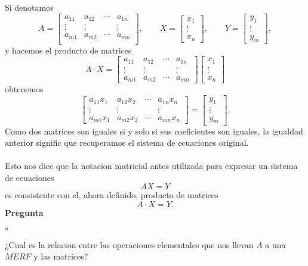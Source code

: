 \documentclass{article}
\theoremstyle{definition}
\theoremstyle{definition}
\theoremstyle{remark}
\begin{document}
Si denotamos \[
  A=\begin{bmatrix} a_{11} & a_{12} & \cdots & a_{1n} \\ 
    \vdots & \vdots && \vdots \\
    a_{m1} & a_{m2} & \cdots & a_{mn} \\
    \end{bmatrix}, 
    \quad \quad 
    X=\begin{bmatrix} x_1 \\ \vdots \\ x_n \end{bmatrix}, \quad \quad Y=\begin{bmatrix} y_1 \\ \vdots \\ y_m \end{bmatrix}
,\]
y hacemos el producto de matrices \[
  A \cdot X = \begin{bmatrix} a_{11} & a_{12} & \cdots & a_{1n} \\ 
    \vdots & \vdots & & \vdots \\
    a_{m1} & a_{m2} & \cdots & a_{mn} \end{bmatrix} \begin{bmatrix} x_1 \\ \vdots \\ x_n \end{bmatrix}
    \] obtenemos \[
   \begin{bmatrix} a_{11}x_1 & a_{12}x_2 & \cdots & a_{1n}x_n \\ 
    \vdots & \vdots & & \vdots \\
    a_{m1}x_1 & a_{m2}x_2 & \cdots & a_{mn}x_n \end{bmatrix} = \begin{bmatrix} y_1 \\ \vdots \\ y_m \end{bmatrix}.
  \]
  Como dos matrices son iguales si y solo si sus coeficientes son iguales, la igualdad anterior signific que recuperamos el sistema de ecuaciones original.\\\\
  Esto nos dice que la notacion matricial antes utilizada para expresar un sistema de ecuaciones \[
AX=Y
  \]
  es consistente con el, ahora definido, producto de matrices \[
A\cdot X = Y.
  \]
  \textbf{Pregunta} \begin{list}{$\circ$}{}  
\item  ¿Cual es la relacion entre las operaciones elementales que nos llevan $A$ a una $MERF$ y las matrices?
\end{list}
\end{document}
